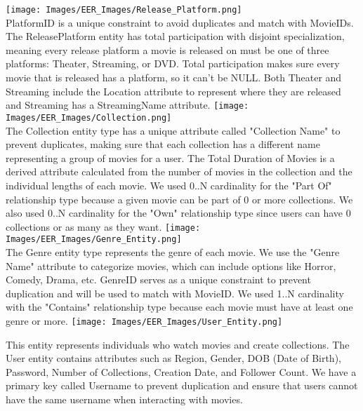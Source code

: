 \documentclass[12pt]{article}
\begin{document}
{{    }
    \vspace{10pt} 
    \texttt{[image: Images/EER\_Images/Release\_Platform.png]} \\
    {
        PlatformID is a unique constraint to avoid duplicates and match with MovieIDs. The ReleasePlatform entity has total participation with disjoint specialization, meaning every release platform a movie is released on must be one of three platforms: Theater, Streaming, or DVD. Total participation makes sure every movie that is released has a platform, so it can't be NULL. Both Theater and Streaming include the Location attribute to represent where they are released and Streaming has a StreamingName attribute. 
    }
    \vspace{10pt} 
    \texttt{[image: Images/EER\_Images/Collection.png]} \\
    {
        The Collection entity type has a unique attribute called "Collection Name" to prevent duplicates, making sure that each collection has a different name representing a group of movies for a user. The Total Duration of Movies is a derived attribute calculated from the number of movies in the collection and the individual lengths of each movie. We used 0..N cardinality for the "Part Of" relationship type because a given movie can be part of 0 or more collections. We also used 0..N cardinality for the "Own" relationship type since users can have 0 collections or as many as they want.
    }
    \vspace{10pt} 
    \texttt{[image: Images/EER\_Images/Genre\_Entity.png]} \\
    {
        The Genre entity type represents the genre of each movie. We use the "Genre Name" attribute to categorize movies, which can include options like Horror, Comedy, Drama, etc. GenreID serves as a unique constraint to prevent duplication and will be used to match with MovieID. We used 1..N cardinality with the "Contains" relationship type because each movie must have at least one genre or more.
    }
    \vspace{10pt} 
    \texttt{[image: Images/EER\_Images/User\_Entity.png]} 
    {
        This entity represents individuals who watch movies and create collections. The User entity contains attributes such as Region, Gender, DOB (Date of Birth), Password, Number of Collections, Creation Date, and Follower Count. We have a primary key called Username to prevent duplication and ensure that users cannot have the same username when interacting with movies.

}}
\end{document}

